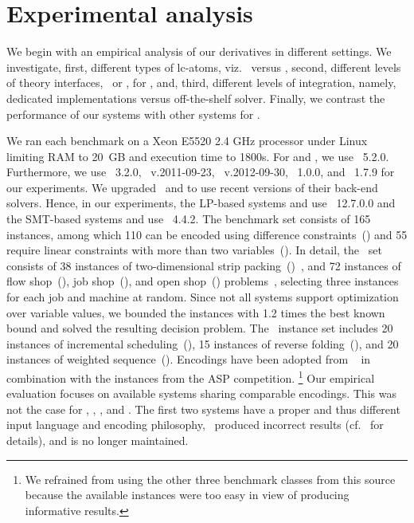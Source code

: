 
\section{Experimental analysis}\label{sec:experiments}

We begin with an empirical analysis of our \clingo{} derivatives in different settings.
We investigate, 
first,  different types of lc-atoms, viz.\  versus ,
second, different levels of theory interfaces, \python\ or \cpp, for ,
and, third, different levels of integration, namely, dedicated implementations versus off-the-shelf solver.
Finally, we contrast the performance of our systems with other systems for .

We ran each benchmark on a Xeon E5520 2.4 GHz processor under Linux limiting RAM to 20~GB and execution time to 1800s.
For  and , we use \clingo~5.2.0.
Furthermore, we use \clingcon~3.2.0,
\dingo~v.2011-09-23,
\mingo~v.2012-09-30,
\ezsmt~1.0.0, 
and \ezcsp~1.7.9 for our experiments.
We upgraded \dingo\ and \mingo{} to use recent versions of their back-end solvers.
Hence, in our experiments,
the LP-based systems  and \mingo{} use \cplex~12.7.0.0
and 
the SMT-based systems \dingo{} and \ezsmt{} use \zzz~4.4.2.
The benchmark set consists of 165 instances, 
among which 110 can be encoded using difference constraints~(\dl)
and 55 require linear constraints with more than two variables~(\lc).
In detail, the \dl\ set consists of
38 instances of two-dimensional strip packing~(\tsp)~\cite{sointabana10a},
and 72 instances of flow shop~(\fs), job shop~(\js), and open shop~(\os) problems~\cite{taillard93a},
selecting three instances for each job and machine at random.
Since not all systems support optimization over variable values,
we bounded the instances with 1.2 times the best known bound and solved the resulting decision problem.
The \lc\ instance set includes
20 instances of incremental scheduling~(\is),
15 instances of reverse folding~(\rf), and
20 instances of weighted sequence~(\ws).
Encodings have been adopted from ~\cite{liesus16a}
in combination with the instances from the ASP competition.%
\footnote{We refrained from using the other three benchmark classes from this source because the available instances were too easy in view of producing informative results.}
Our empirical evaluation focuses on available systems sharing comparable encodings.
This was not the case for \aspartame, \aspmttosmt, \inca, and \dlvhex[\textsc{cp}].
The first two systems have a proper and thus different input language and encoding philosophy,
\inca\ produced incorrect results (cf.~\cite{bakaossc16a} for details),
and \dlvhex[\textsc{cp}] is no longer maintained.

